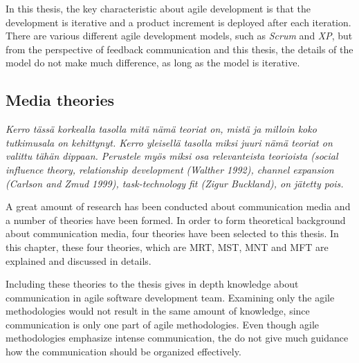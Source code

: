\documentclass[english,12pt,a4paper,pdftex]{article}
\begin{document}
In this thesis, the key characteristic about agile development is that the development is iterative and a product increment is deployed after each iteration. There are various different agile development models, such as \emph{Scrum} and \emph{\acl{XP}}, but from the perspective of feedback communication and this thesis, the details of the model do not make much difference, as long as the model is iterative.

\subsection{Media theories}

\emph{Kerro tässä korkealla tasolla mitä nämä teoriat on, mistä ja milloin koko tutkimusala on kehittynyt. Kerro yleisellä tasolla miksi juuri nämä teoriat on valittu tähän dippaan. Perustele myös miksi osa relevanteista teorioista (social influence theory, relationship development (Walther 1992), channel expansion (Carlson and Zmud 1999), task-technology fit (Zigur Buckland), on jätetty pois. }

A great amount of research has been conducted about communication media and a number of theories have been formed. In order to form theoretical background about communication media, four theories have been selected to this thesis. In this chapter, these four theories, which are \ac{MRT}, \ac{MST}, \ac{MNT} and \ac{MFT} are explained and discussed in details.

Including these theories to the thesis gives in depth knowledge about communication in agile software development team. Examining only the agile methodologies would not result in the same amount of knowledge, since communication is only one part of agile methodologies. Even though agile methodologies emphasize intense communication, the do not give much guidance how the communication should be organized effectively.
\end{document}
